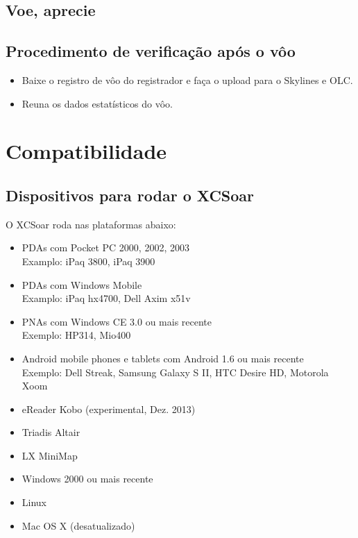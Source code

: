 \subsection*{Voe, aprecie}
\vspace{4em}

\subsection*{Procedimento de verificação após o vôo}
\begin{itemize}
\item Baixe o registro de vôo do registrador e faça o upload para o Skylines e OLC.
\item Reuna os dados estatísticos do vôo.
\end{itemize}
\newpage




\section{Compatibilidade}

\subsection*{Dispositivos para rodar o XCSoar}

O XCSoar roda nas plataformas abaixo:

\begin{itemize}
\item PDAs com Pocket PC 2000, 2002, 2003 \\
  Examplo: iPaq 3800, iPaq 3900
\item PDAs com Windows Mobile \\
  Examplo: iPaq hx4700, Dell Axim x51v
\item PNAs com Windows CE 3.0 ou mais recente \\
  Exemplo: HP314, Mio400
\item Android mobile phones e tablets com Android 1.6 ou mais recente \\
  Exemplo: Dell Streak, Samsung Galaxy S II, HTC Desire HD,
  Motorola Xoom
\item eReader Kobo (experimental, Dez. 2013)
\item Triadis Altair
\item LX MiniMap
\item Windows 2000 ou mais recente
\item Linux
\item Mac OS X (desatualizado)
\end{itemize}

